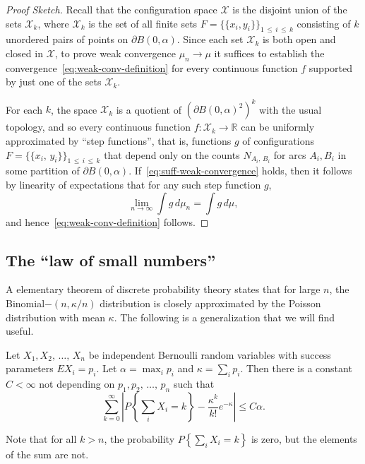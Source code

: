 \documentclass[AHL, Unicode, longabstracts, published]{cedram}
\newcommand{\zz}[1]{\mathbb #1}
\begin{document}
\begin{proof}
[Proof Sketch] Recall that the configuration space $\mathcal{X}$ is the disjoint union of the sets $\mathcal{X}_{k}$, where $\mathcal{X}_{k}$ is the set of all finite sets $F=\{\{x_{i},y_{i} \} \}_{1\,\leq\,i\,\leq\, k}$ consisting of $k$ unordered pairs of points on $\partial B (0,\alpha)$. Since each set $\mathcal{X}_{k}$ is both open and closed in $\mathcal{X}$, to prove weak convergence $\mu_{n}\rightarrow \mu$ it suffices to establish the convergence~\eqref{eq:weak-conv-definition} for every continuous function $f$ supported by just one of the sets $\mathcal{X}_{k}$.

For each $k$, the space $\mathcal{X}_{k}$ is a quotient of $(\partial B (0,\alpha)^{2})^{k}$ with the usual topology, and so every continuous function $f:\mathcal{X}_{k}\rightarrow \zz{R}$ can be uniformly approximated by ``step functions'', that is, functions $g$ of configurations $F=\{\{x_{i},\,y_{i} \} \}_{1\,\leq\,i\,\leq\,k}$ that depend only on the counts $N_{A_{i},\,B_{i}}$ for arcs $A_{i},B_{i}$ in some partition of $\partial B (0,\alpha)$. If~\eqref{eq:suff-weak-convergence} holds, then it follows by linearity of expectations that for any such step function $g$,
\[
\lim_{n \rightarrow \infty} \int g\,d\mu_{n}=\int g\,d\mu,
\]
and hence~\eqref{eq:weak-conv-definition} follows.
\end{proof}



\subsection{The ``law of small numbers''}\label{ssec:lsn}
A elementary theorem of discrete probability theory states that for large $n$, the Binomial$- (n,\kappa /n)$ distribution is closely approximated by the Poisson distribution with mean $\kappa$. The following is a generalization that we will find useful.

\begin{prop}\label{proposition:lsn}
Let $X_{1},X_{2},\,\dotsc,\,X_{n}$ be independent Bernoulli random variables with success parameters $EX_{i}=p_{i}$. Let $\alpha =\max_{i}p_{i}$ and $\kappa =\sum_{i}p_{i}$. Then there is a constant $C<\infty$ not depending on $p_{1},p_{2},\,\dotsc,\,p_{n}$ such that
\[
\sum_{k=0}^{\infty} \left\lvert P\left\{\sum_{i}X_{i}=k
\right\}-\frac{\kappa^{k}}{k!}e^{-\kappa}\right\rvert \leq C\alpha.
\]
\end{prop}

Note that for all $k > n$, the probability $P\left\{\sum_{i}X_{i}=k \right\}$ is zero, but the elements of the sum are not.
\end{document}
